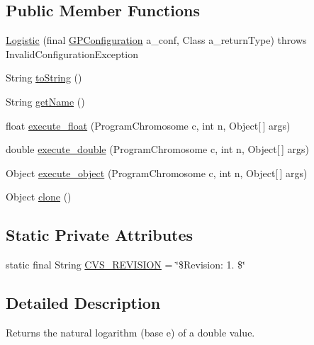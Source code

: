 \subsection*{Public Member Functions}
\begin{DoxyCompactItemize}
\item 
\hyperlink{classexamples_1_1gp_1_1symbolic_regression_1_1_logistic_ad6ccf68e66f064097c6d777db3531ca9}{Logistic} (final \hyperlink{classorg_1_1jgap_1_1gp_1_1impl_1_1_g_p_configuration}{G\-P\-Configuration} a\-\_\-conf, Class a\-\_\-return\-Type)  throws Invalid\-Configuration\-Exception 
\item 
String \hyperlink{classexamples_1_1gp_1_1symbolic_regression_1_1_logistic_a2cf02c431aa965fce45e94776cfa5066}{to\-String} ()
\item 
String \hyperlink{classexamples_1_1gp_1_1symbolic_regression_1_1_logistic_a3935f92da2307f96f96016602efa7191}{get\-Name} ()
\item 
float \hyperlink{classexamples_1_1gp_1_1symbolic_regression_1_1_logistic_a30f42d1c6d71fe7309e1d1dc7fce2966}{execute\-\_\-float} (Program\-Chromosome c, int n, Object\mbox{[}$\,$\mbox{]} args)
\item 
double \hyperlink{classexamples_1_1gp_1_1symbolic_regression_1_1_logistic_abeaca5e57ffb627393c0e176beba38c3}{execute\-\_\-double} (Program\-Chromosome c, int n, Object\mbox{[}$\,$\mbox{]} args)
\item 
Object \hyperlink{classexamples_1_1gp_1_1symbolic_regression_1_1_logistic_a2ba26a6df46c260cd8c469d6770be4c0}{execute\-\_\-object} (Program\-Chromosome c, int n, Object\mbox{[}$\,$\mbox{]} args)
\item 
Object \hyperlink{classexamples_1_1gp_1_1symbolic_regression_1_1_logistic_a8b3af9d570553ee9de3cc08839c82a7e}{clone} ()
\end{DoxyCompactItemize}
\subsection*{Static Private Attributes}
\begin{DoxyCompactItemize}
\item 
static final String \hyperlink{classexamples_1_1gp_1_1symbolic_regression_1_1_logistic_a9581fbe46496f615f17c4f2232a9f431}{C\-V\-S\-\_\-\-R\-E\-V\-I\-S\-I\-O\-N} = \char`\"{}\$Revision\-: 1. \$\char`\"{}
\end{DoxyCompactItemize}


\subsection{Detailed Description}
Returns the natural logarithm (base e) of a double value.

